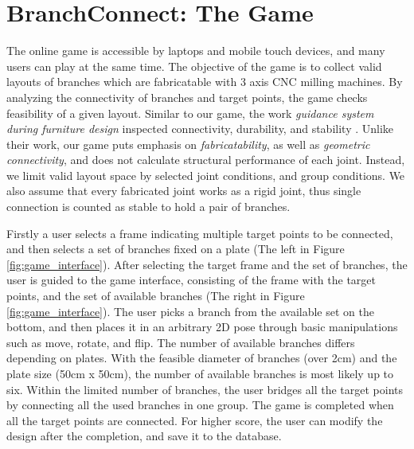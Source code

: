 \section{BranchConnect: The Game}
\label{sec:game}
The online game is accessible by laptops and mobile touch devices, and many users can play at the same time.
The objective of the game is to collect valid layouts of branches which are fabricatable with 3 axis CNC milling machines.
By analyzing the connectivity of branches and target points, the game checks feasibility of a given layout.
Similar to our game, the work \textit{guidance system during furniture design} inspected connectivity, durability, and stability \cite{umetani2012guided}.
Unlike their work, our game puts emphasis on \textit{fabricatability}, as well as \textit{geometric connectivity}, and does not calculate structural performance of each joint.
Instead, we limit valid layout space by selected joint conditions, and group conditions.
We also assume that every fabricated joint works as a rigid joint, thus single connection is counted as stable to hold a pair of branches.



Firstly a user selects a frame indicating multiple target points to be connected, and then selects a set of branches fixed on a plate (The left in Figure \ref{fig:game_interface}).
After selecting the target frame and the set of branches, the user is guided to the game interface, consisting of the frame with the target points, and the set of available branches (The right in Figure \ref{fig:game_interface}).
The user picks a branch from the available set on the bottom, and then places it in an arbitrary 2D pose through basic manipulations such as move, rotate, and flip.
The number of available branches differs depending on plates.
With the feasible diameter of branches (over 2cm) and the plate size (50cm x 50cm), the number of available branches is most likely up to six.
Within the limited number of branches, the user bridges all the target points by connecting all the used branches in one group.
The game is completed when all the target points are connected.
For higher score, the user can modify the design after the completion, and save it to the database.


